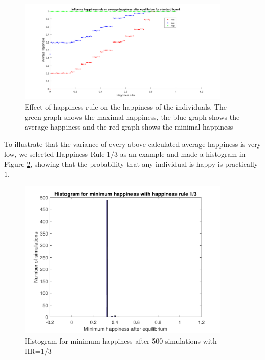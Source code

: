 \begin{figure}[h!]
    \centering
    \includegraphics[width=0.9\textwidth]{happinessregel-gemhappinesseind-2.pdf}
    \caption{Effect of happiness rule on the happiness of the individuals. The green graph shows the maximal happiness, the blue graph shows the average happiness and the red graph shows the minimal happiness}
    \label{happyhappy}
\end{figure}

To illustrate that the variance of every above calculated average happiness is very low, we  selected Happiness Rule $1/3$ as an example and made a histogram in Figure \ref{minhappy}, showing that the probability that any individual is happy is practically $1$.

\begin{figure}[H]
    \centering
    \includegraphics[width=0.9\textwidth]{histogram_min_happiness_een_derde.pdf}
    \caption{Histogram for minimum happiness after 500 simulations with HR=1/3 }
    \label{minhappy}
\end{figure}

